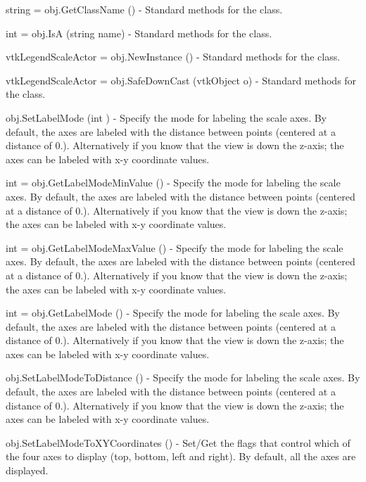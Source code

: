 \begin{DoxyItemize}
\item {\ttfamily string = obj.\-Get\-Class\-Name ()} -\/ Standard methods for the class.  
\item {\ttfamily int = obj.\-Is\-A (string name)} -\/ Standard methods for the class.  
\item {\ttfamily vtk\-Legend\-Scale\-Actor = obj.\-New\-Instance ()} -\/ Standard methods for the class.  
\item {\ttfamily vtk\-Legend\-Scale\-Actor = obj.\-Safe\-Down\-Cast (vtk\-Object o)} -\/ Standard methods for the class.  
\item {\ttfamily obj.\-Set\-Label\-Mode (int )} -\/ Specify the mode for labeling the scale axes. By default, the axes are labeled with the distance between points (centered at a distance of 0.). Alternatively if you know that the view is down the z-\/axis; the axes can be labeled with x-\/y coordinate values.  
\item {\ttfamily int = obj.\-Get\-Label\-Mode\-Min\-Value ()} -\/ Specify the mode for labeling the scale axes. By default, the axes are labeled with the distance between points (centered at a distance of 0.). Alternatively if you know that the view is down the z-\/axis; the axes can be labeled with x-\/y coordinate values.  
\item {\ttfamily int = obj.\-Get\-Label\-Mode\-Max\-Value ()} -\/ Specify the mode for labeling the scale axes. By default, the axes are labeled with the distance between points (centered at a distance of 0.). Alternatively if you know that the view is down the z-\/axis; the axes can be labeled with x-\/y coordinate values.  
\item {\ttfamily int = obj.\-Get\-Label\-Mode ()} -\/ Specify the mode for labeling the scale axes. By default, the axes are labeled with the distance between points (centered at a distance of 0.). Alternatively if you know that the view is down the z-\/axis; the axes can be labeled with x-\/y coordinate values.  
\item {\ttfamily obj.\-Set\-Label\-Mode\-To\-Distance ()} -\/ Specify the mode for labeling the scale axes. By default, the axes are labeled with the distance between points (centered at a distance of 0.). Alternatively if you know that the view is down the z-\/axis; the axes can be labeled with x-\/y coordinate values.  
\item {\ttfamily obj.\-Set\-Label\-Mode\-To\-X\-Y\-Coordinates ()} -\/ Set/\-Get the flags that control which of the four axes to display (top, bottom, left and right). By default, all the axes are displayed.  

\end{DoxyItemize}
